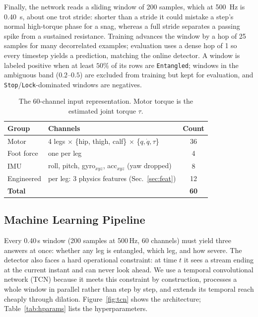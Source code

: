 \documentclass[conference]{IEEEtran}
\begin{document}
Finally, the network reads a sliding window of 200 samples, which at 500~Hz is 0.40~s, about one trot stride: shorter than a stride it could mistake a step's normal high-torque phase for a snag, whereas a full stride separates a passing spike from a sustained resistance. Training advances the window by a hop of 25 samples for many decorrelated examples; evaluation uses a dense hop of 1 so every timestep yields a prediction, matching the online detector. A window is labeled positive when at least $50\%$ of its rows are \texttt{Entangled}; windows in the ambiguous band ($0.2$--$0.5$) are excluded from training but kept for evaluation, and \texttt{Stop}/\texttt{Lock}-dominated windows are negatives.
\begin{table}[t]
\centering
\caption{The 60-channel input representation. Motor torque is the estimated joint torque $\tau$.}
\label{tab:features}
\footnotesize
\begin{tabular}{@{}llc@{}}
\toprule
Group & Channels & Count \\
\midrule
Motor & 4 legs $\times$ \{hip, thigh, calf\} $\times$ \{$q,\dot q,\tau$\} & 36 \\
Foot force & one per leg & 4 \\
IMU & roll, pitch, gyro$_{xyz}$, acc$_{xyz}$ (yaw dropped) & 8 \\
Engineered & per leg: 3 physics features (Sec.~\ref{sec:feat}) & 12 \\
\midrule
\textbf{Total} & & \textbf{60} \\
\bottomrule
\end{tabular}
\end{table}

\subsection{Machine Learning Pipeline}

Every 0.40\,s window (200 samples at 500\,Hz, 60 channels) must yield three answers at once: whether any leg is entangled, which leg, and how severe. The detector also faces a hard operational constraint: at time $t$ it sees a stream ending at the current instant and can never look ahead. We use a temporal convolutional network (TCN) \cite{bai2018tcn} because it meets this constraint by construction, processes a whole window in parallel rather than step by step, and extends its temporal reach cheaply through dilation. Figure~\ref{fig:tcn} shows the architecture; Table~\ref{tab:hparams} lists the hyperparameters.
\end{document}

